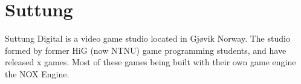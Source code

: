 \section{Suttung}
Suttung Digital is a video game studio located in Gjøvik Norway.
The studio formed by former HiG (now NTNU) game programming students,
and have released x  games.
Most of these games being built with their own game engine the NOX Engine.

